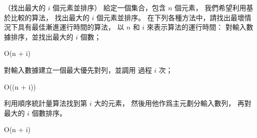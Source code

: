 \startPROBLEM
（找出最大的 $i$ 個元素並排序）
給定一個集合，包含 $n$ 個元素，
我們希望利用基於比較的算法，
找出最大的 $i$ 個元素並排序。
在下列各種方法中，請找出最壞情況下具有最佳漸進運行時間的算法，
以 $n$ 和 $i$ 來表示算法的運行時間：
\startigBase[a]\startitem
對輸入數據排序，並找出最大的 $i$ 個數；
\stopitem\stopigBase

\startANSWER
\startformula
O(n + i)
\stopformula
\stopANSWER

\startigBase[continue]\startitem
對輸入數據建立一個最大優先對列，並調用  過程 $i$ 次；
\stopitem\stopigBase

\startANSWER
\startformula
O((n + i))
\stopformula
\stopANSWER

\startigBase[continue]\startitem
利用順序統計量算法找到第 $i$ 大的元素，
然後用他作爲主元劃分輸入數列，
再對最大的 $i$ 個數排序。
\stopitem\stopigBase

\startANSWER
\startformula
O(n + i)
\stopformula
\stopANSWER

\stopPROBLEM
